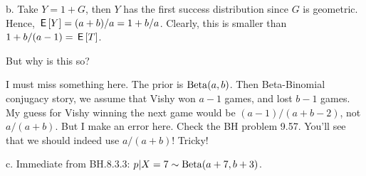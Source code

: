 \begin{exercise}
\begin{solution}
b. Take $Y=1+G$, then $Y$ has the first success distribution since $G$ is geometric. Hence, $\,\mathsf{E}\left[Y\right] = (a+b)/a= 1 + b/a$. Clearly, this is smaller than $1+b/(a-1) = \,\mathsf{E}\left[T\right]$.

But why is this so?


I must miss something here.
The prior is $\mathrm{Beta}(a, b)$.
Then Beta-Binomial conjugacy story, we assume that Vishy won $a-1$ games, and lost $b-1$ games.
My guess for Vishy winning the next game would be $(a-1)/(a+b-2)$, not $a/(a+b)$.
But I make an error here. Check the BH problem 9.57. You'll see that we should indeed use $a/(a+b)$!  Tricky!

c.  Immediate from BH.8.3.3: $p|X=7 \sim\mathrm{Beta}(a+7, b+3)$.
\end{solution}
\end{exercise}



